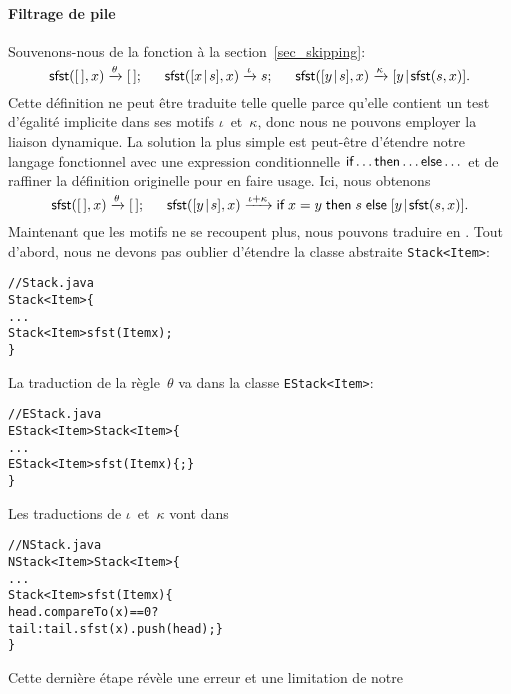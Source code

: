 \paragraph{Filtrage de pile}

Souvenons-nous de la fonction  à la
section~\vref{sec_skipping}:
\begin{equation*}
\textsf{sfst}([\,],x)          \xrightarrow{\smash{\theta}} [\,];\quad\;\;
\textsf{sfst}([{x}\!\mid\!{s}],x)  \xrightarrow{\smash{\iota}}  s;\quad\;\;
\textsf{sfst}([{y}\!\mid\!{s}],x)  \xrightarrow{\smash{\kappa}}
                                         [{y}\!\mid\!{\textsf{sfst}(s,x)}].
\end{equation*}
Cette définition ne peut être traduite telle quelle parce qu'elle
contient un test d'égalité implicite dans ses motifs
\(\iota\)~et~\(\kappa\), donc nous ne pouvons employer la liaison
dynamique. La solution la plus simple est peut-être d'étendre notre
langage fonctionnel avec une expression conditionnelle \(\textsf{if}
\dots \textsf{then} \dots \textsf{else} \dots\) et de raffiner la définition
originelle pour en faire usage. Ici, nous obtenons
\begin{equation*}
\textsf{sfst}([\,],x)          \xrightarrow{\smash{\theta}} [\,];\quad\;\;
\textsf{sfst}([{y}\!\mid\!{s}],x)  \xrightarrow{\smash{\iota+\kappa}}
\textsf{if} \; x = y \; \textsf{then} \; s \;
\textsf{else} \; [{y}\!\mid\!{\textsf{sfst}(s,x)}].
\end{equation*}
Maintenant que les motifs ne se recoupent plus, nous pouvons traduire
en \Java. Tout d'abord, nous ne devons pas oublier d'étendre la classe
abstraite \texttt{Stack<Item>}:
\begin{alltt}
// Stack.java
\public \abstractX \class Stack<Item> \{
  ...
  \public \abstractX Stack<Item> sfst(\final Item x);
\}
\end{alltt}
La traduction de la règle~\(\theta\) va dans la classe
\texttt{EStack<Item>}:
\begin{alltt}
// EStack.java
\public \final \class EStack<Item> \extends Stack<Item> \{
  ...
  \public EStack<Item> sfst(\final Item x) \{ \return \this; \}
\}
\end{alltt}
Les traductions de \(\iota\)~et~\(\kappa\) vont dans
\begin{alltt}
// NStack.java
\public \final \class NStack<Item> \extends Stack<Item> \{
  ...
  \public Stack<Item> sfst(\final Item x) \{
    \return head.compareTo(x) == 0 ?
           tail : tail.sfst(x).push(head); \}
\}
\end{alltt}
Cette dernière étape révèle une erreur et une limitation de notre
